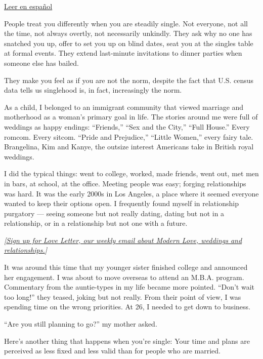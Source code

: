 \href{https://www.nytimes3xbfgragh.onion/es/2020/08/16/espanol/estilos-de-vida/soltera-amor.html}{Leer
en español}

People treat you differently when you are steadily single. Not everyone,
not all the time, not always overtly, not necessarily unkindly. They ask
why no one has snatched you up, offer to set you up on blind dates, seat
you at the singles table at formal events. They extend last-minute
invitations to dinner parties when someone else has bailed.

They make you feel as if you are not the norm, despite the fact that
U.S. census data tells us singlehood is, in fact, increasingly the norm.

As a child, I belonged to an immigrant community that viewed marriage
and motherhood as a woman's primary goal in life. The stories around me
were full of weddings as happy endings: ``Friends,'' ``Sex and the
City,'' ``Full House.'' Every romcom. Every sitcom. ``Pride and
Prejudice,'' ``Little Women,'' every fairy tale. Brangelina, Kim and
Kanye, the outsize interest Americans take in British royal weddings.

I did the typical things: went to college, worked, made friends, went
out, met men in bars, at school, at the office. Meeting people was easy;
forging relationships was hard. It was the early 2000s in Los Angeles, a
place where it seemed everyone wanted to keep their options open. I
frequently found myself in relationship purgatory --- seeing someone but
not really dating, dating but not in a relationship, or in a
relationship but not one with a future.

\emph{{[}}\href{https://www.nytimes3xbfgragh.onion/newsletters/love-letter}{\emph{Sign
up for Love Letter, our weekly email about Modern Love, weddings and
relationships.}}\emph{{]}}

It was around this time that my younger sister finished college and
announced her engagement. I was about to move overseas to attend an
M.B.A. program. Commentary from the auntie-types in my life became more
pointed. ``Don't wait too long!'' they teased, joking but not really.
From their point of view, I was spending time on the wrong priorities.
At 26, I needed to get down to business.

``Are you still planning to go?'' my mother asked.

Here's another thing that happens when you're single: Your time and
plans are perceived as less fixed and less valid than for people who are
married.

